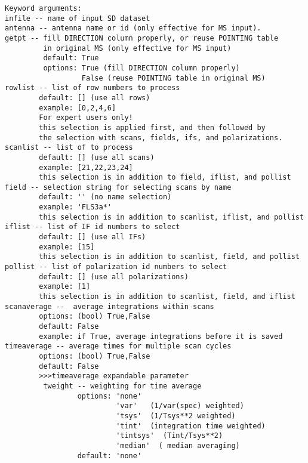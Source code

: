 \begin{verbatim}
Keyword arguments:
infile -- name of input SD dataset
antenna -- antenna name or id (only effective for MS input). 
getpt -- fill DIRECTION column properly, or reuse POINTING table 
         in original MS (only effective for MS input)
         default: True
         options: True (fill DIRECTION column properly)
                  False (reuse POINTING table in original MS)
rowlist -- list of row numbers to process
        default: [] (use all rows)
        example: [0,2,4,6]
        For expert users only!
        this selection is applied first, and then followed by
        the selection with scans, fields, ifs, and polarizations. 
scanlist -- list of to process
        default: [] (use all scans)
        example: [21,22,23,24]
        this selection is in addition to field, iflist, and pollist
field -- selection string for selecting scans by name
        default: '' (no name selection)
        example: 'FLS3a*'
        this selection is in addition to scanlist, iflist, and pollist
iflist -- list of IF id numbers to select
        default: [] (use all IFs)
        example: [15]
        this selection is in addition to scanlist, field, and pollist
pollist -- list of polarization id numbers to select
        default: [] (use all polarizations)
        example: [1]
        this selection is in addition to scanlist, field, and iflist
scanaverage --  average integrations within scans
        options: (bool) True,False
        default: False
        example: if True, average integrations before it is saved
timeaverage -- average times for multiple scan cycles
        options: (bool) True,False
        default: False
        >>>timeaverage expandable parameter
         tweight -- weighting for time average
                 options: 'none'
                          'var'   (1/var(spec) weighted)
                          'tsys'  (1/Tsys**2 weighted)
                          'tint'  (integration time weighted)
                          'tintsys'  (Tint/Tsys**2)
                          'median'  ( median averaging)
                 default: 'none'


\end{verbatim}
